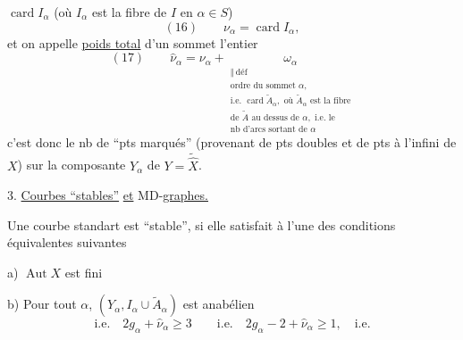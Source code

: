 $\operatorname{card}I_\alpha$ (où $I_\alpha$ est la fibre de $I$ en $\alpha\in S$)
\[
(16)\qquad\nu_\alpha=\operatorname{card}I_\alpha,
\]
et on appelle \uline{poids total} d'un sommet l'entier
\[
(17)\qquad\widehat\nu_\alpha=\nu_\alpha+
\underset{\substack{\Vert\ \mathrm{déf}\\
\text{ordre du sommet }\alpha,\\
\text{i.e. }\operatorname{card}\widetilde A_\alpha,\text{ où }\widetilde A_\alpha\text{ est la fibre}\\
\text{de }\widetilde A\text{ au dessus de }\alpha,\text{ i.e. le}\\
\text{nb d'arcs sortant de }\alpha}}{\omega_\alpha}
\]
c'est donc le nb de ``pts marqués'' (provenant de pts doubles et de pts à l'infini de $X$) sur la composante $Y_\alpha$ de $Y=\widetilde{\widehat X}$.

3. \uline{Courbes ``stables''} \uline{et} MD-\uline{graphes.}

Une courbe standart  est ``stable'', si elle satisfait à l'une des conditions équivalentes suivantes

a) $\operatorname{Aut}X$ est fini

b) Pour tout $\alpha$, $(Y_\alpha,I_\alpha\cup\widetilde A_\alpha)$ est anabélien
\[
\text{i.e.}\quad 2g_\alpha+\widehat\nu_\alpha\geq3\qquad
\text{i.e.}\quad 2g_\alpha-2+\widehat\nu_\alpha\geq1,\quad\text{i.e.}
\]
